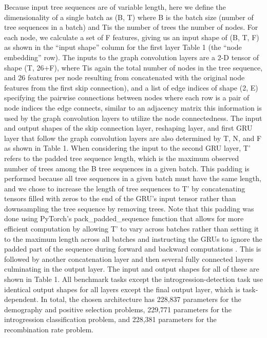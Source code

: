 Because input tree sequences are of variable length, here we define the dimensionality of a single batch as (B, T\timesN) where B is the batch size (number of tree sequences in a batch) and T\timesN is the number of trees \times the number of nodes. For each node, we calculate a set of F features, giving us an input shape of (B, T\timesN, F) as shown in the “input shape” column for the first layer Table 1 (the “node embedding” row). The inputs to the graph convolution layers are a 2-D tensor of shape (T\timesN, 26+F), where T\timesN is again the total number of nodes in the tree sequence, and 26 features per node resulting from concatenated with the original node features from the first skip connection), and a list of edge indices of shape (2, E) specifying the pairwise connections between nodes where each row is a pair of node indices the edge connects, similar to an adjacency matrix this information is used by the graph convolution layers to utilize the node connectedness.  The input and output shapes of the skip connection layer, reshaping layer, and first GRU layer that follow the graph convolution layers are also determined by T, N, and F as shown in Table 1. When considering the input to the second GRU layer, T’ refers to the padded tree sequence length, which is the maximum observed number of trees among the B tree sequences in a given batch. This padding is performed because all tree sequences in a given batch must have the same length, and we chose to increase the length of tree sequences to T’ by concatenating tensors filled with zeros to the end of the GRU’s input tensor rather than downsampling the tree sequence by removing trees. Note that this padding was done using PyTorch’s  pack\_padded\_sequence function that allows for more efficient computation by allowing T’ to vary across batches rather than setting it to the maximum length across all batches and instructing the GRUs to ignore the padded part of the sequence during forward and backward computations \cite{paszkePyTorchImperativeStyle2019}. This is followed by another concatenation layer and then several fully connected layers culminating in the output layer.  The input and output shapes for all of these are shown in Table 1.  All benchmark tasks except the introgression-detection task use identical output shapes for all layers except the final output layer, which is task-dependent.  In total, the chosen architecture has 228,837 parameters for the demography and positive selection problems, 229,771 parameters for the introgression classification problem, and 228,381 parameters for the recombination rate problem.

